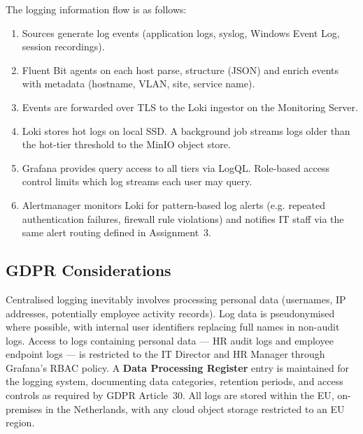 The logging information flow is as follows:

\begin{enumerate}
    \item Sources generate log events (application logs, syslog, Windows Event Log, session recordings).
    \item Fluent Bit agents on each host parse, structure (JSON) and enrich events with metadata (hostname, VLAN, site, service name).
    \item Events are forwarded over TLS to the Loki ingestor on the Monitoring Server.
    \item Loki stores hot logs on local SSD. A background job streams logs older than the hot-tier threshold to the MinIO object store.
    \item Grafana provides query access to all tiers via LogQL. Role-based access control limits which log streams each user may query.
    \item Alertmanager monitors Loki for pattern-based log alerts (e.g. repeated authentication failures, firewall rule violations) and notifies IT staff via the same alert routing defined in Assignment~3.
\end{enumerate}

\subsection{GDPR Considerations}

Centralised logging inevitably involves processing personal data (usernames, IP addresses, potentially employee activity records). Log data is pseudonymised where possible, with internal user identifiers replacing full names in non-audit logs. Access to logs containing personal data --- HR audit logs and employee endpoint logs --- is restricted to the IT Director and HR Manager through Grafana's RBAC policy. A \textbf{Data Processing Register} entry is maintained for the logging system, documenting data categories, retention periods, and access controls as required by GDPR Article~30. All logs are stored within the EU, on-premises in the Netherlands, with any cloud object storage restricted to an EU region.
